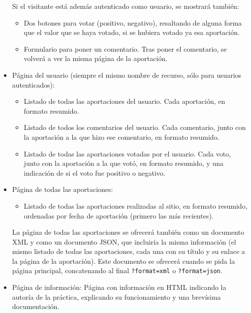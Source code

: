 \begin{itemize}
    Si el visitante está además autenticado como usuario, se mostrará también:

    \begin{itemize}
    \item Dos botones para votar (positivo, negativo), resaltando de alguna forma que el valor que se haya votado, si se hubiera votado ya esa aportación.
    \item Formulario para poner un comentario. Tras poner el comentario, se volverá a ver la misma página de la aportación.
    \end{itemize}

  \item Página del usuario (siempre el mismo nombre de recurso, sólo para usuarios autenticados):

    \begin{itemize}
    \item Listado de todas las aportaciones del usuario. Cada aportación, en formato resumido.
    \item Listado de todos los comentarios del usuario. Cada comentario, junto con la aportación a la que hizo ese comentario, en formato resumido.
    \item Listado de todas las aportaciones votadas por el usuario. Cada voto, junto con la aportación a la que votó, en formato resumido, y una indicación de si el voto fue positivo o negativo.
    \end{itemize}
    
  \item Página de todas las aportaciones:

    \begin{itemize}
    \item Listado de todas las aportaciones realizadas al sitio, en formato resumido, ordenadas por fecha de aportación (primero las más recientes).
    \end{itemize}

  La página de todas las aportaciones se ofrecerá también como un documento XML y como un documento JSON, que incluiría la misma información (el mismo listado de todas las aportaciones, cada una con su título y su enlace a la página de la aportación). Este documento se ofrecerá cuando se pida la página principal, concatenando al final \verb|?format=xml| o \verb|?format=json|.
 
  \item Página de información: Página con información en HTML indicando la autoría de la práctica, explicando su funcionamiento y una brevísima documentación.

\end{itemize}

